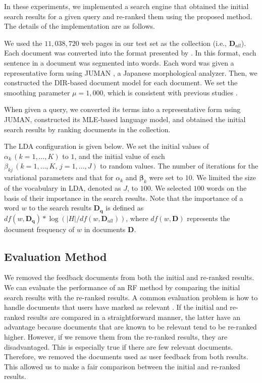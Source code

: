 \documentclass[english]{jnlp_1.4_rep}
\begin{document}
In these experiments, we implemented a search engine that obtained the
initial search results for a given query and re-ranked them using the
proposed method. The details of the implementation are as follows.

We used the $11,038,720$ web pages in our test set as the collection
(i.e., $\bm{D}_{all}$). Each document was converted into the format
    presented by . In this format,
each sentence in a document was segmented into words. Each word was
given a representative form using JUMAN \cite{Kurohashi1994}, a Japanese
morphological analyzer. Then, we constructed the DIR-based document
model for each document. We set the smoothing parameter $\mu = 1,000$,
which is consistent with previous
studies \cite{Zhai2001,Wei2006,Yi2009}.

When given a query, we converted its terms into a representative form
using JUMAN, constructed its MLE-based language model, and obtained the
initial search results by ranking documents in the collection.

The LDA configuration is given below. We set the initial values of
$\alpha_{k} \, (k = 1, \dots, K)$ to $1$, and the initial value of each
$\beta_{kj} \, (k = 1, \dots, K, \, j = 1, \dots, J)$ to random
values. The number of iterations for the variational parameters and that
for $\alpha_{k}$ and $\bm{\beta}_{k}$ were set to $10$. We limited the
size of the vocabulary in LDA, denoted as $J$, to $100$. We selected
$100$ words on the basis of their importance in the search results. Note
that the importance of a word $w$ to the search results
$\bm{D}_{\bm{q}}$ is defined as $df(w, \bm{D}_{\bm{q}}) * \log(|H| /
df(w, \bm{D}_{all}))$, where $df(w, \bm{D})$ represents the document
frequency of $w$ in documents $\bm{D}$.


\subsection{Evaluation Method}
\label{ssec:evaluation_method}

We removed the feedback documents from both the initial and re-ranked
results. We can evaluate the performance of an RF method by comparing
the initial search results with the re-ranked results. A common
evaluation problem is how to handle documents that users have marked as
relevant \cite{Hull1993}. If the initial and re-ranked results are
compared in a straightforward manner, the latter have an advantage
because documents that are known to be relevant tend to be re-ranked
higher. However, if we remove them from the re-ranked results, they are
disadvantaged. This is especially true if there are few relevant
documents. Therefore, we removed the documents used as user feedback
from both results. This allowed us to make a fair comparison between the
initial and re-ranked results.
\end{document}
